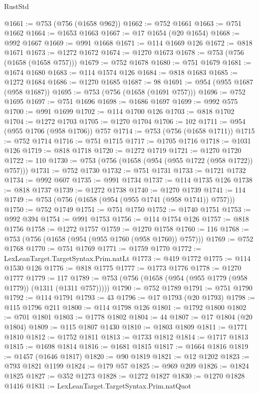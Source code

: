 \begin{lexlean}{RustStd}
\begin{coremodule}
@1661 := @753 (@756 (@1658 @962))
@1662 := @752 @1661
@1663 := @751 @1662
@1664 := @1653 @1663
@1667 := @17 @1654 (@20 @1654)
@1668 := @992 @1667
@1669 := @991 @1668
@1671 := @114 @1669 @126
@1672 := @818 @1671
@1673 := @1272 @1672
@1674 := @1270 @1673
@1678 := @753 (@756 (@1658 (@1658 @757)))
@1679 := @752 @1678
@1680 := @751 @1679
@1681 := @1674 @1680
@1683 := @114 @1574 @126
@1684 := @818 @1683
@1685 := @1272 @1684
@1686 := @1270 @1685
@1687 := 98
@1691 := @954 (@955 @1687 (@958 @1687))
@1695 := @753 (@756 (@1658 (@1691 @757)))
@1696 := @752 @1695
@1697 := @751 @1696
@1698 := @1686 @1697
@1699 := @992 @575
@1700 := @991 @1699
@1702 := @114 @1700 @126
@1703 := @818 @1702
@1704 := @1272 @1703
@1705 := @1270 @1704
@1706 := 102
@1711 := @954 (@955 @1706 (@958 @1706)) @757
@1714 := @753 (@756 (@1658 @1711))
@1715 := @752 @1714
@1716 := @751 @1715
@1717 := @1705 @1716
@1718 := @1031 @126
@1719 := @818 @1718
@1720 := @1272 @1719
@1721 := @1270 @1720
@1722 := 110
@1730 := @753 (@756 (@1658 (@954 (@955 @1722 (@958 @1722)) @757)))
@1731 := @752 @1730
@1732 := @751 @1731
@1733 := @1721 @1732
@1734 := @992 @607
@1735 := @991 @1734
@1737 := @114 @1735 @126
@1738 := @818 @1737
@1739 := @1272 @1738
@1740 := @1270 @1739
@1741 := 114
@1749 := @753 (@756 (@1658 (@954 (@955 @1741 (@958 @1741)) @757)))
@1750 := @752 @1749
@1751 := @751 @1750
@1752 := @1740 @1751
@1753 := @992 @394
@1754 := @991 @1753
@1756 := @114 @1754 @126
@1757 := @818 @1756
@1758 := @1272 @1757
@1759 := @1270 @1758
@1760 := 116
@1768 := @753 (@756 (@1658 (@954 (@955 @1760 (@958 @1760)) @757)))
@1769 := @752 @1768
@1770 := @751 @1769
@1771 := @1759 @1770
@1772 := LexLeanTarget.TargetSyntax.Prim.natLt
@1773 := @419 @1772
@1775 := @114 @1530 @126
@1776 := @818 @1775
@1777 := @1773 @1776
@1778 := @1270 @1777
@1779 := 117
@1789 := @753 (@756 (@1658 (@954 (@955 @1779 (@958 @1779)) (@1311 (@1311 @757)))))
@1790 := @752 @1789
@1791 := @751 @1790
@1792 := @114 @1791
@1793 := 43
@1796 := @17 @1793 (@20 @1793)
@1798 := @115 @1796 @211
@1800 := @114 @1798 @126
@1801 := @1792 @1800
@1802 := @701 @1801
@1803 := @1778 @1802
@1804 := 44
@1807 := @17 @1804 (@20 @1804)
@1809 := @115 @1807 @1430
@1810 := @1803 @1809
@1811 := @1771 @1810
@1812 := @1752 @1811
@1813 := @1733 @1812
@1814 := @1717 @1813
@1815 := @1698 @1814
@1816 := @1681 @1815
@1817 := @1664 @1816
@1819 := @1457 (@1646 @1817)
@1820 := @90 @1819
@1821 := @12 @1202
@1823 := @793 @1821 @1199
@1824 := @179 @57
@1825 := @969 @209
@1826 := @1824 @1825
@1827 := @352 @1273
@1828 := @1272 @1827
@1830 := @1270 @1828 @1416
@1831 := LexLeanTarget.TargetSyntax.Prim.natQuot

\end{coremodule}
\end{lexlean}
